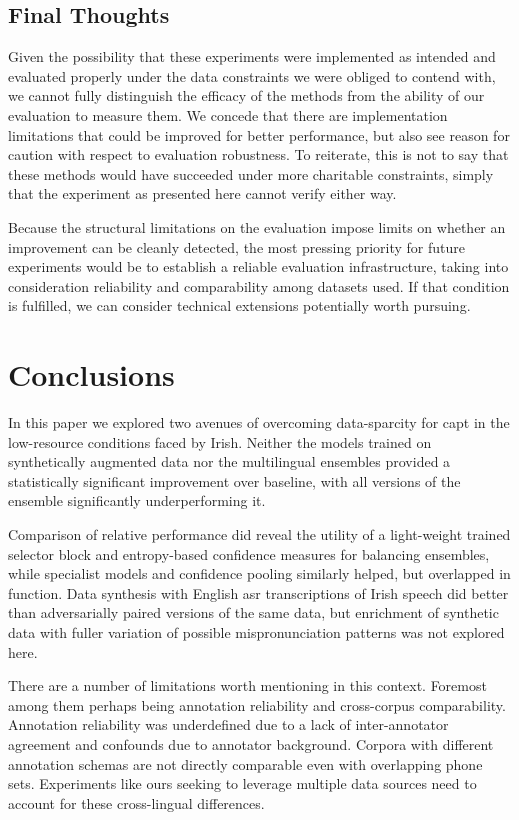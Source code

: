 \documentclass[thesis]{cluu}
\begin{document}
\section{Final Thoughts}
Given the possibility that these experiments were implemented as intended and evaluated properly under the data constraints we were obliged to contend with, we cannot fully distinguish the efficacy of the methods from the ability of our evaluation to measure them. We concede that there are implementation limitations that could be improved for better performance, but also see reason for caution with respect to evaluation robustness. To reiterate, this is not to say that these methods would have succeeded under more charitable constraints, simply that the experiment as presented here cannot verify either way. 

Because the structural limitations on the evaluation impose limits on whether an improvement can be cleanly detected, the most pressing priority for future experiments would be to establish a reliable evaluation infrastructure, taking into consideration reliability and comparability among datasets used. If that condition is fulfilled, we can consider technical extensions potentially worth pursuing.

\chapter{Conclusions}
In this paper we explored two avenues of overcoming data-sparcity for \gls{capt} in the low-resource conditions faced by Irish. Neither the models trained on synthetically augmented data nor the multilingual ensembles provided a statistically significant improvement over baseline, with all versions of the ensemble significantly underperforming it.

Comparison of relative performance did reveal the utility of a light-weight trained selector block and entropy-based confidence measures for balancing ensembles, while specialist models and confidence pooling similarly helped, but overlapped in function. Data synthesis with English \gls{asr} transcriptions of Irish speech did better than adversarially paired versions of the same data, but enrichment of synthetic data with fuller variation of possible mispronunciation patterns was not explored here. 

There are a number of limitations worth mentioning in this context. Foremost among them perhaps being annotation reliability and cross-corpus comparability. Annotation reliability was underdefined due to a lack of inter-annotator agreement and confounds due to annotator background. Corpora with different annotation schemas are not directly comparable even with overlapping phone sets. Experiments like ours seeking to leverage multiple data sources need to account for these cross-lingual differences.
\end{document}
